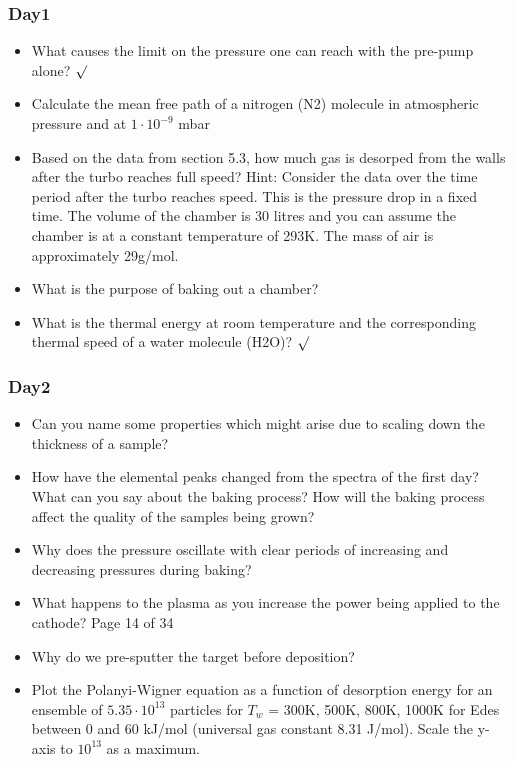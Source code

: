 \documentclass[]{article}
\begin{document}
\subsubsection{Day1}
\begin{itemize}  
	\item What causes the limit on the pressure one can reach with the pre-pump alone? $\surd$
	\item  Calculate the mean free path of a nitrogen (N2) molecule in atmospheric pressure and at $1 \cdot 10^{−9}$ mbar 
	\item Based on the data from section 5.3, how much gas is desorped from the walls after the turbo reaches full speed? Hint: Consider the data over the time period after the turbo reaches speed. This is the pressure drop in a ﬁxed time. The volume of the chamber is 30 litres and you can assume the chamber is at a constant temperature of 293K. The mass of air is approximately 29g/mol.
	 

	\item What is the purpose of baking out a chamber? 
	\item What is the thermal energy at room temperature and the corresponding thermal speed of a water molecule (H2O)? $\surd$
\end{itemize}
\subsubsection{Day2}
\begin{itemize}
	 \item Can you name some properties which might arise due to scaling down the thickness of a sample? \item How have the elemental peaks changed from the spectra of the ﬁrst day? What can you say about the baking process? How will the baking process affect the quality of the samples being grown? \item Why does the pressure oscillate with clear periods of increasing and decreasing pressures during baking? \item What happens to the plasma as you increase the power being applied to the cathode?
	Page 14 of 34
	\item Why do we pre-sputter the target before deposition? \item  Plot the Polanyi-Wigner equation as a function of desorption energy for an ensemble of $5.35 \cdot 10^{13}$ particles for $T_w$ = 300K, 500K, 800K, 1000K for Edes between 0 and 60 kJ/mol (universal gas constant 8.31 J/mol). Scale the y-axis to $10^{13}$ as a maximum.
	
\end{itemize}
\end{document}
